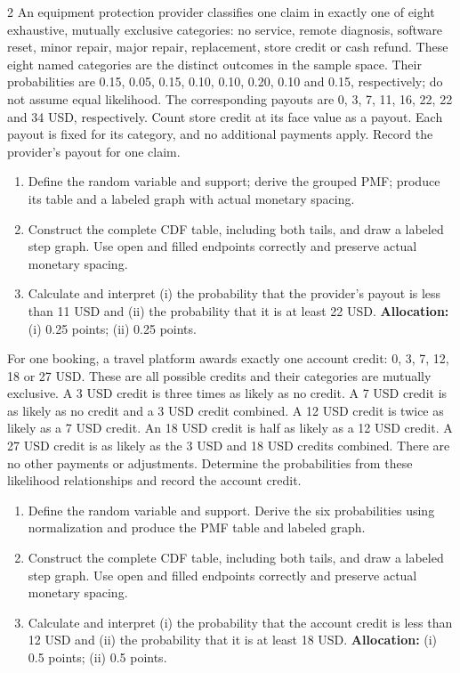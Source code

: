\begin{multicols*}{2}
An equipment protection provider classifies one claim in exactly one of eight exhaustive, mutually exclusive categories: no service, remote diagnosis, software reset, minor repair, major repair, replacement, store credit or cash refund. These eight named categories are the distinct outcomes in the sample space. Their probabilities are 0.15, 0.05, 0.15, 0.10, 0.10, 0.20, 0.10 and 0.15, respectively; do not assume equal likelihood. The corresponding payouts are 0, 3, 7, 11, 16, 22, 22 and 34 USD, respectively. Count store credit at its face value as a payout. Each payout is fixed for its category, and no additional payments apply. Record the provider's payout for one claim.

\begin{enumerate}[label=(\alph*)]
\item Define the random variable and support; derive the grouped PMF; produce its table and a labeled graph with actual monetary spacing. 
\item Construct the complete CDF table, including both tails, and draw a labeled step graph. Use open and filled endpoints correctly and preserve actual monetary spacing. 
\item Calculate and interpret (i) the probability that the provider's payout is less than 11 USD and (ii) the probability that it is at least 22 USD. 
\textbf{Allocation:} (i) 0.25 points; (ii) 0.25 points.
\end{enumerate}
\columnbreak
{}
For one booking, a travel platform awards exactly one account credit: 0, 3, 7, 12, 18 or 27 USD. These are all possible credits and their categories are mutually exclusive. A 3 USD credit is three times as likely as no credit. A 7 USD credit is as likely as no credit and a 3 USD credit combined. A 12 USD credit is twice as likely as a 7 USD credit. An 18 USD credit is half as likely as a 12 USD credit. A 27 USD credit is as likely as the 3 USD and 18 USD credits combined. There are no other payments or adjustments. Determine the probabilities from these likelihood relationships and record the account credit.

\begin{enumerate}[label=(\alph*)]
\item Define the random variable and support. Derive the six probabilities using normalization and produce the PMF table and labeled graph. 
\item Construct the complete CDF table, including both tails, and draw a labeled step graph. Use open and filled endpoints correctly and preserve actual monetary spacing. 
\item Calculate and interpret (i) the probability that the account credit is less than 12 USD and (ii) the probability that it is at least 18 USD. 
\textbf{Allocation:} (i) 0.5 points; (ii) 0.5 points.
\end{enumerate}


\end{multicols*}
